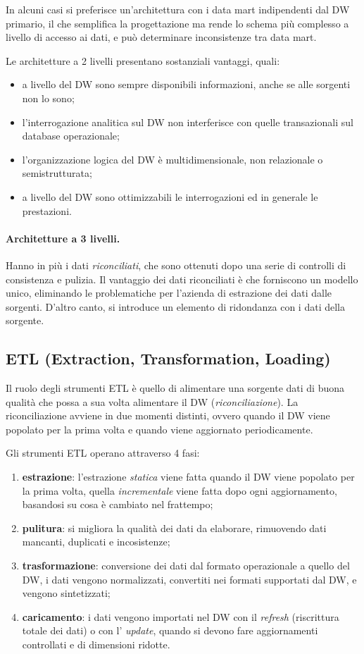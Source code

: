 \documentclass[a4paper, 10pt]{article}
\begin{document}
	In alcuni casi si preferisce un'architettura con i data mart indipendenti dal DW primario, il che semplifica la progettazione ma rende lo schema più complesso a livello di accesso ai dati, e può determinare inconsistenze tra data mart.
	
	Le architetture a 2 livelli presentano sostanziali vantaggi, quali: \begin{itemize}
		\item a livello del DW sono sempre disponibili informazioni, anche se alle sorgenti non lo sono;
		\item l'interrogazione analitica sul DW non interferisce con quelle transazionali sul database operazionale;
		\item l'organizzazione logica del DW è multidimensionale, non relazionale o semistrutturata;
		\item a livello del DW sono ottimizzabili le interrogazioni ed in generale le prestazioni.
	\end{itemize}

	\paragraph{Architetture a 3 livelli.} Hanno in più i dati \textit{riconciliati}, che sono ottenuti dopo una serie di controlli di consistenza e pulizia. Il vantaggio dei dati riconciliati è che forniscono un modello unico, eliminando le problematiche per l'azienda di estrazione dei dati dalle sorgenti. D'altro canto, si introduce un elemento di ridondanza con i dati della sorgente.
	
	\subsection{ETL (Extraction, Transformation, Loading)}
	Il ruolo degli strumenti ETL è quello di alimentare una sorgente dati di buona qualità che possa a sua volta alimentare il DW (\textit{riconciliazione}). La riconciliazione avviene in due momenti distinti, ovvero quando il DW viene popolato per la prima volta e quando viene aggiornato periodicamente.
	
	Gli strumenti ETL operano attraverso 4 fasi: \begin{enumerate}
		\item \textbf{estrazione}: l'estrazione \textit{statica} viene fatta quando il DW viene popolato per la prima volta, quella \textit{incrementale} viene fatta dopo ogni aggiornamento, basandosi su cosa è cambiato nel frattempo;
		\item \textbf{pulitura}: si migliora la qualità dei dati da elaborare, rimuovendo dati mancanti, duplicati e incosistenze;
		\item \textbf{trasformazione}: conversione dei dati dal formato operazionale a quello del DW, i dati vengono normalizzati, convertiti nei formati supportati dal DW, e vengono sintetizzati;
		\item \textbf{caricamento}: i dati vengono importati nel DW con il \textit{refresh} (riscrittura totale dei dati) o con l' \textit{update}, quando si devono fare aggiornamenti controllati e di dimensioni ridotte.
	\end{enumerate}
	
\end{document}
